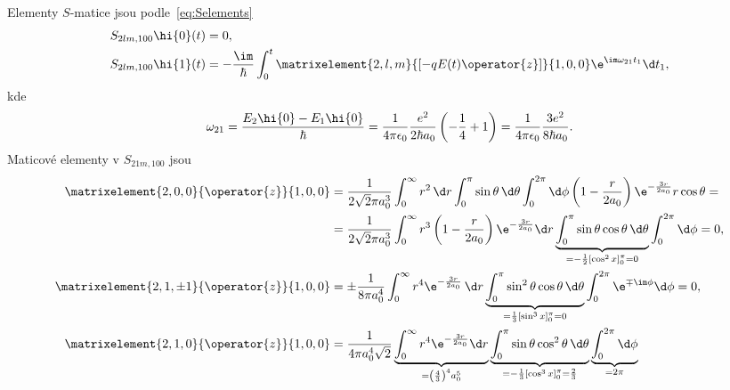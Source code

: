\begin{solution}
    Elementy $S$-matice jsou podle~\eqref{eq:Selements}
    \begin{subequations}
        \begin{align}
            S_{2lm,100}\hi{0}(t)&=0,\\
            S_{2lm,100}\hi{1}(t)&=-\frac{\im}{\hbar}\int_{0}^{t}\matrixelement{2,l,m}{\left[-qE(t)\operator{z}\right]}{1,0,0}\e^{\im\omega_{21}t_{1}}\d t_{1},
            \label{eq:SH2lm}
        \end{align}            
    \end{subequations}
    kde
    \begin{equation}
        \omega_{21}
            =\frac{E_{2}\hi{0}-E_{1}\hi{0}}{\hbar}
            =\frac{1}{4\pi\epsilon_{0}}\frac{e^{2}}{2\hbar a_{0}}\left(-\frac{1}{4}+1\right)
            =\frac{1}{4\pi\epsilon_{0}}\frac{3e^{2}}{8\hbar a_{0}}.
    \end{equation}
    Maticové elementy v $S_{21m,100}$ jsou
    \begin{subequations}
        \begin{align}
            \matrixelement{2,0,0}{\operator{z}}{1,0,0}
                &=\frac{1}{2\sqrt{2}\pi a_{0}^{3}}\int_{0}^{\infty}r^{2}\,\d r\int_{0}^{\pi}\sin{\theta}\,\d\theta\int_{0}^{2\pi}\d\phi \left(1-\frac{r}{2a_{0}}\right)\e^{-\frac{3r}{2a_{0}}}r\cos{\theta}=\nonumber\\
                &=\frac{1}{2\sqrt{2}\pi a_{0}^{3}}
                    \int_{0}^{\infty}r^{3}\left(1-\frac{r}{2a_{0}}\right)\e^{-\frac{3r}{2a_{0}}}\d r
                    \underbrace{\int_{0}^{\pi}\sin{\theta}\cos{\theta}\,\d\theta}_{=-\frac{1}{2}\left[\cos^{2}{x}\right]_{0}^{\pi}=0}
                    \int_{0}^{2\pi}\d\phi=0,\\
            \matrixelement{2,1,\pm1}{\operator{z}}{1,0,0}
                &=\pm\frac{1}{8\pi a_{0}^{4}}
                    \int_{0}^{\infty}r^{4}\e^{-\frac{3r}{2a_{0}}}\,\d r
                    \underbrace{\int_{0}^{\pi}\sin^{2}{\theta}\cos{\theta}\,\d\theta}_{=\frac{1}{3}\left[\sin^{3}{x}\right]_{0}^{\pi}=0}
                    \int_{0}^{2\pi}\e^{\mp\im\phi}\d\phi=0,\\
            \matrixelement{2,1,0}{\operator{z}}{1,0,0}
                &=\frac{1}{4\pi a_{0}^{4}\sqrt{2}}
                    \underbrace{\int_{0}^{\infty}r^{4}\e^{-\frac{3r}{2a_{0}}}\d r}_{=\left(\frac{4}{3}\right)^{4}a_{0}^{5}}
                    \underbrace{\int_{0}^{\pi}\sin{\theta}\cos^{2}\theta\,\d\theta}_{=-\frac{1}{3}\left[\cos^{3}{x}\right]_{0}^{\pi}=\frac{2}{3}}
                    \underbrace{\int_{0}^{2\pi}\d\phi}_{=2\pi}

\end{align}
\end{subequations}
\end{solution}
